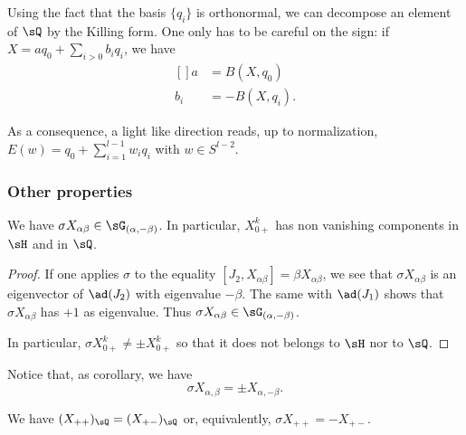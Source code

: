 \begin{remark}		\label{LONGRemBProdScal}
	Using the fact that the basis $\{ q_i\}$ is orthonormal, we can decompose an element of $\sQ$ by the Killing form. One only has to be careful on the sign: if $X=aq_0+\sum_{i>0}b_iq_i$, we have
	\begin{equation}		\label{LONGEqsabKillProjComp}
		\begin{aligned}[]
			a   & =B(X,q_0)   \\
			b_i & =-B(X,q_i).
		\end{aligned}
	\end{equation}
\end{remark}


\begin{remark}	\label{LONGRemOrdreNilpotentQ}
	As a consequence, a light like direction reads, up to normalization, $E(w)=q_0+\sum_{i=1}^{l-1}w_iq_i$ with $w\in S^{l-2}$.
\end{remark}

%
\subsubsection{Other properties}
%


\begin{lemma}		\label{LONGLemXZUAHetQ}
	We have $\sigma X_{\alpha\beta}\in\sG_{(\alpha,-\beta)}$. In particular, $X^k_{0+}$ has non vanishing components in $\sH$ and in $\sQ$.
\end{lemma}

\begin{proof}
	If one applies $\sigma$ to the equality $[J_2,X_{\alpha\beta}]=\beta X_{\alpha\beta}$, we see that $\sigma X_{\alpha\beta}$ is an eigenvector of $\ad(J_2)$ with eigenvalue $-\beta$. The same with $\ad(J_1)$ shows that $\sigma X_{\alpha\beta}$ has $+1$ as eigenvalue. Thus $\sigma X_{\alpha\beta}\in\sG_{(\alpha,-\beta)}$.

	In particular, $\sigma X^k_{0+}\neq \pm X^k_{0+}$ so that it does not belongs to $\sH$ nor to $\sQ$.
\end{proof}

Notice that, as corollary, we have
\begin{equation}
	\sigma X_{\alpha,\beta}=\pm X_{\alpha,-\beta}.
\end{equation}


\begin{lemma}				\label{LONGLemSigmaXppEgalXPm}
	We have $(X_{++})_{\sQ}=(X_{+-})_{\sQ}$ or, equivalently, $\sigma X_{++}=-X_{+-}$.
\end{lemma}

